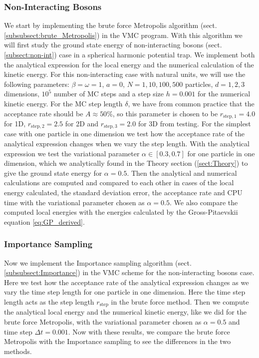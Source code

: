 \documentclass[12pt,a4paper,english]{article}
\begin{document}
\subsubsection{Non-Interacting Bosons}
\label{subsubsect:Coding_non-int}
We start by implementing the brute force Metropolis algorithm (sect. \ref{subsubsect:brute_Metropolis}) in the VMC program. With this algorithm we will first study the ground state energy of non-interacting bosons (sect. \ref{subsect:non-int}) case in a spherical harmonic potential trap. We implement both the analytical expression for the local energy and the numerical calculation of the kinetic energy. For this non-interacting case with natural units, we will use the following parameters: $\beta=\omega=1$, $a=0$, $N=1,10,100,500$ particles, $d=1,2,3$ dimensions, $10^5$ number of MC steps and a step size $h=0.001$ for the numerical kinetic energy. For the MC step length $\delta$, we have from common practice that the acceptance rate should be $A\approx50$\%, so this parameter is chosen to be $r_{\text{step},1}=4.0$ for 1D, $r_{\text{step},2}=2.5$ for 2D and $r_{\text{step},3}=2.0$ for 3D from testing. For the simplest case with one particle in one dimension we test how the acceptance rate of the analytical expression changes when we vary the step length. With the analytical expression we test the variational parameter $\alpha\in[0.3,0.7]$ for one particle in one dimension, which we analytically found in the Theory section (\ref{sect:Theory}) to give the ground state energy for $\alpha=0.5$. Then the analytical and numerical calculations are computed and compared to each other in cases of the local energy calculated, the standard deviation error, the acceptance rate and CPU time with the variational parameter chosen as $\alpha=0.5$. We also compare the computed local energies with the energies calculated by the Gross-Pitaevskii equation \ref{eq:GP_derived}.
 
\subsubsection{Importance Sampling}
\label{subsubsect:Coding_importance}
Now we implement the Importance sampling algorithm (sect. \ref{subsubsect:Importance}) in the VMC scheme for the non-interacting bosons case. Here we test how the acceptance rate of the analytical expression changes as we vary the time step length for one particle in one dimension. Here the time step length acts as the step length $r_{\text{step}}$ in the brute force method. Then we compute the analytical local energy and the numerical kinetic energy, like we did for the brute force Metropolis, with the variational parameter chosen as $\alpha=0.5$ and time step $\Delta t=0.001$. Now with these results, we compare the brute force Metropolis with the Importance sampling to see the differences in the two methods.
\end{document}
